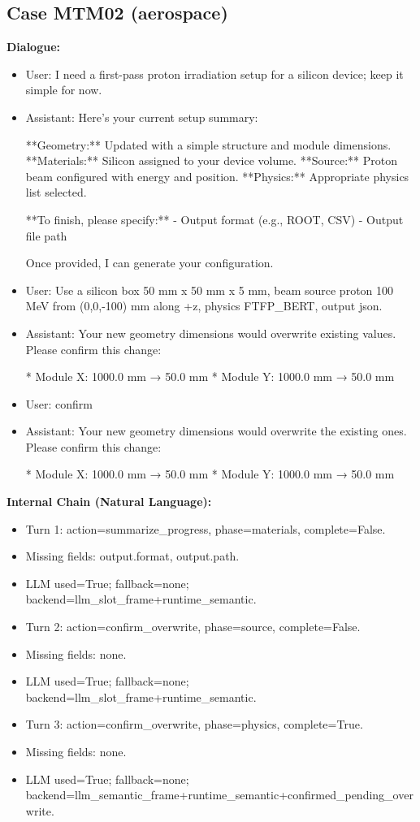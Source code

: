 \documentclass[11pt]{ctexart}
\begin{document}
\subsection{Case MTM02 (aerospace)}
\textbf{Dialogue:}
\begin{itemize}
\item User: I need a first-pass proton irradiation setup for a silicon device; keep it simple for now.
\item Assistant: Here's your current setup summary:

**Geometry:** Updated with a simple structure and module dimensions.
**Materials:** Silicon assigned to your device volume.
**Source:** Proton beam configured with energy and position.
**Physics:** Appropriate physics list selected.

**To finish, please specify:**
- Output format (e.g., ROOT, CSV)
- Output file path

Once provided, I can generate your configuration.
\item User: Use a silicon box 50 mm x 50 mm x 5 mm, beam source proton 100 MeV from (0,0,-100) mm along +z, physics FTFP\_BERT, output json.
\item Assistant: Your new geometry dimensions would overwrite existing values. Please confirm this change:

*   Module X: 1000.0 mm → 50.0 mm
*   Module Y: 1000.0 mm → 50.0 mm
\item User: confirm
\item Assistant: Your new geometry dimensions would overwrite the existing ones. Please confirm this change:

*   Module X: 1000.0 mm → 50.0 mm
*   Module Y: 1000.0 mm → 50.0 mm
\end{itemize}
\textbf{Internal Chain (Natural Language):}
\begin{itemize}
\item Turn 1: action=summarize\_progress, phase=materials, complete=False.
\item Missing fields: output.format, output.path.
\item LLM used=True; fallback=none; backend=llm\_slot\_frame+runtime\_semantic.
\item Turn 2: action=confirm\_overwrite, phase=source, complete=False.
\item Missing fields: none.
\item LLM used=True; fallback=none; backend=llm\_slot\_frame+runtime\_semantic.
\item Turn 3: action=confirm\_overwrite, phase=physics, complete=True.
\item Missing fields: none.
\item LLM used=True; fallback=none; backend=llm\_semantic\_frame+runtime\_semantic+confirmed\_pending\_overwrite.
\end{itemize}
\end{document}
